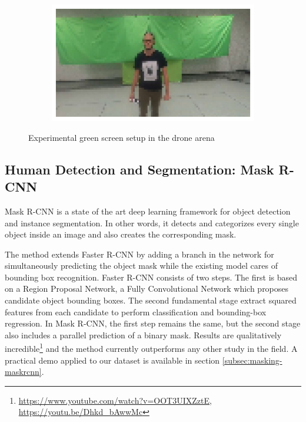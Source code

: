 \begin{figure}[!h]
\begin{center}
\begin{subfigure}[h]{0.24\textwidth}
		\end{subfigure}
		\hfill
		\begin{subfigure}[h]{0.24\textwidth}
			\centering
			\includegraphics[width=1\textwidth]{"contents/images/04-greenscreen-4"}
		\end{subfigure}
	\end{center}
	\vspace{-0.5cm}
	\caption[Experimental green screen setup in the drone arena]{Experimental green screen setup in the drone arena}
	\label{fig:greenscreen}
\end{figure}



\subsection{Human Detection and Segmentation: Mask R-CNN}
\label{subsec:sota-maskrcnn}

Mask R-CNN \cite{he2018mask} is a state of the art deep learning framework for object detection and instance segmentation. In other words, it detects and categorizes every single object inside an image and also creates the corresponding mask.

The method extends Faster R-CNN \cite{ren2016faster} by adding a branch in the network for simultaneously predicting the object mask while the existing model cares of bounding box recognition. Faster R-CNN consists of two steps. The first is based on a Region Proposal Network, a Fully Convolutional Network \cite{shelhamer2016fully} which proposes candidate object bounding boxes. The second fundamental stage extract squared features from each candidate to perform classification and bounding-box regression. In Mask R-CNN, the first step remains the same, but the second stage also includes a parallel prediction of a binary mask.
Results are qualitatively incredible\footnote{\url{https://www.youtube.com/watch?v=OOT3UIXZztE}, \url{https://youtu.be/Dhkd_bAwwMc}} and the method currently outperforms any other study in the field. A practical demo applied to our dataset is available in section \ref{subsec:masking-maskrcnn}.

